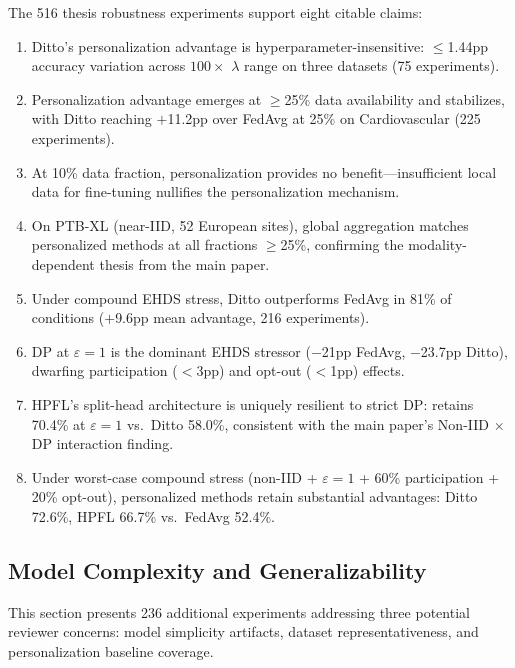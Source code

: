 \documentclass[conference]{IEEEtran}
\begin{document}
The 516 thesis robustness experiments support eight citable claims:

\begin{enumerate}
    \item Ditto's personalization advantage is hyperparameter-insensitive: $\leq$1.44pp accuracy variation across $100\times$ $\lambda$ range on three datasets (75 experiments).
    \item Personalization advantage emerges at $\geq$25\% data availability and stabilizes, with Ditto reaching $+$11.2pp over FedAvg at 25\% on Cardiovascular (225 experiments).
    \item At 10\% data fraction, personalization provides no benefit---insufficient local data for fine-tuning nullifies the personalization mechanism.
    \item On PTB-XL (near-IID, 52 European sites), global aggregation matches personalized methods at all fractions $\geq$25\%, confirming the modality-dependent thesis from the main paper.
    \item Under compound EHDS stress, Ditto outperforms FedAvg in 81\% of conditions ($+$9.6pp mean advantage, 216 experiments).
    \item DP at $\varepsilon{=}1$ is the dominant EHDS stressor ($-$21pp FedAvg, $-$23.7pp Ditto), dwarfing participation ($<$3pp) and opt-out ($<$1pp) effects.
    \item HPFL's split-head architecture is uniquely resilient to strict DP: retains 70.4\% at $\varepsilon{=}1$ vs.\ Ditto 58.0\%, consistent with the main paper's Non-IID $\times$ DP interaction finding.
    \item Under worst-case compound stress (non-IID + $\varepsilon{=}1$ + 60\% participation + 20\% opt-out), personalized methods retain substantial advantages: Ditto 72.6\%, HPFL 66.7\% vs.\ FedAvg 52.4\%.
\end{enumerate}


\subsection{Model Complexity and Generalizability}
\label{sec:model_complexity}

This section presents 236 additional experiments addressing three potential reviewer concerns: model simplicity artifacts, dataset representativeness, and personalization baseline coverage.
\end{document}
